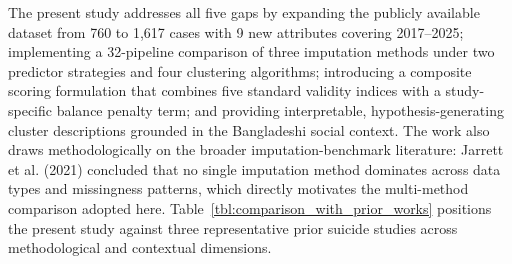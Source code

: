 The present study addresses all five gaps by expanding the publicly available dataset from 760 to 1,617 cases with 9 new attributes covering 2017--2025; implementing a 32-pipeline comparison of three imputation methods under two predictor strategies and four clustering algorithms; introducing a composite scoring formulation that combines five standard validity indices with a study-specific balance penalty term; and providing interpretable, hypothesis-generating cluster descriptions grounded in the Bangladeshi social context. The work also draws methodologically on the broader imputation-benchmark literature: Jarrett et al. (2021) \cite{ref8} concluded that no single imputation method dominates across data types and missingness patterns, which directly motivates the multi-method comparison adopted here. Table~\ref{tbl:comparison_with_prior_works} positions the present study against three representative prior suicide studies across methodological and contextual dimensions.

